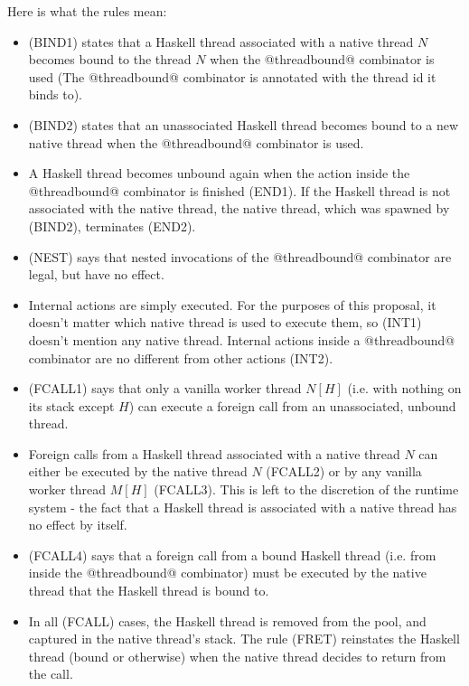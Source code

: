 \documentclass{article}
\begin{document}
Here is what the rules mean:
\begin{itemize}
\item (BIND1) states that a Haskell thread associated with a native thread $N$
becomes bound to the thread $N$ when the @threadbound@ combinator is used (The
@threadbound@ combinator is annotated with the thread id it binds to).

\item (BIND2) states that an unassociated Haskell thread becomes bound to a new
native thread when the @threadbound@ combinator is used.

\item A Haskell thread becomes unbound again when
the action inside the @threadbound@ combinator is finished (END1). If the
Haskell thread is not associated with the native thread, the native thread,
which was spawned by (BIND2), terminates (END2).

\item (NEST) says that nested invocations of the @threadbound@ combinator are
legal, but have no effect.

\item Internal actions are simply executed. For the purposes of this proposal,
it doesn't matter which native thread is used to execute them, so (INT1)
doesn't mention any native thread. Internal actions inside a @threadbound@
combinator are no different from other actions (INT2).

\item (FCALL1) says that only a vanilla worker thread $N[H]$ (i.e. with
nothing on its stack except $H$) can execute a foreign call from an
unassociated, unbound thread.
\item Foreign calls from a Haskell thread associated with a native thread $N$
can either be executed by the native thread $N$ (FCALL2) or by any vanilla
worker thread $M[H]$ (FCALL3).
This is left to the discretion of the runtime system - the fact that a Haskell
thread is associated with a native thread has no effect by itself.

\item (FCALL4) says that a foreign call from a bound Haskell thread (i.e. from
inside the @threadbound@ combinator) must be executed by the native thread that
the Haskell thread is bound to.

\item In all (FCALL) cases, the Haskell thread is removed from the pool, and
captured in the native thread's stack.  The rule (FRET) reinstates the Haskell
thread (bound or otherwise) when the native thread decides to return from the
call.


\end{itemize}
\end{document}
